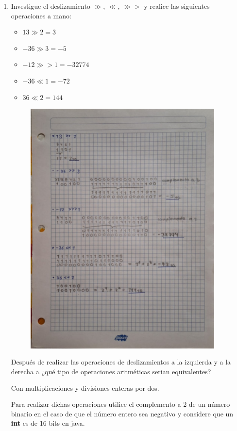 \documentclass[12pt]{article}
\begin{document}
\begin{enumerate}[leftmargin=*]
        \newpage
        \item Investigue el deslizamiento $\gg$, $\ll$, $\gg>$ y realice las siguientes operaciones a mano:
        \begin{itemize}[leftmargin=*]
            \item $13 \gg 2 = 3$
            \item $-36 \gg 3 = -5$
            \item $-12 \gg> 1 = -32774$
            \item $-36 \ll 1 = -72$ 
            \item $36 \ll 2 = 144$
        \end{itemize}
        \begin{figure}[ht]
            \includegraphics[width = 10cm, center]{E3.jpg} 
        \end{figure}
        \newpage

        Después de realizar las operaciones de deslizamientos a la izquierda y a la derecha a ¿qué tipo de operaciones aritméticas serian equivalentes?

        Con multiplicaciones y divisiones enteras por dos.

        Para realizar dichas operaciones utilice el complemento a 2 de un número binario en el caso de que el número entero sea negativo y considere que un \textbf{int} es de 16 bits en java.


\end{enumerate}
\end{document}
